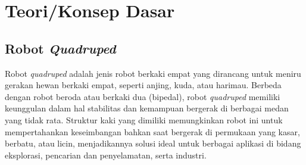 
\section{Teori/Konsep Dasar}



\subsection{Robot \emph{Quadruped}}

Robot \emph{quadruped} adalah jenis robot berkaki empat yang dirancang untuk meniru gerakan hewan berkaki empat,
seperti anjing, kuda, atau harimau. Berbeda dengan robot beroda atau berkaki dua (bipedal),
robot \emph{quadruped} memiliki keunggulan dalam hal stabilitas dan kemampuan bergerak di berbagai medan yang tidak rata\parencite{AshishMajithia_dmcapoqracr}.
Struktur kaki yang dimiliki memungkinkan robot ini untuk mempertahankan keseimbangan bahkan
saat bergerak di permukaan yang kasar, berbatu, atau licin, menjadikannya solusi ideal untuk
berbagai aplikasi di bidang eksplorasi, pencarian dan penyelamatan, serta industri.  

